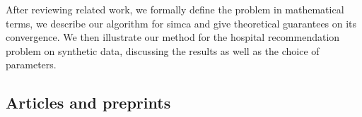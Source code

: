 After reviewing related work, we formally define the problem in mathematical
terms, we describe our algorithm for \ac{simca} and give theoretical guarantees
on its convergence. We then illustrate our method for the hospital
recommendation problem on synthetic data, discussing the results as well as the
choice of parameters.

\subsection{Articles and preprints}
